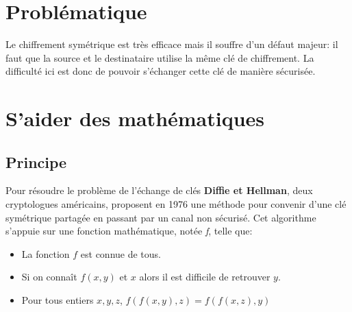 \documentclass[a4paper,11pt]{article}
\begin{document}
\section{Problématique}
Le chiffrement symétrique est très efficace mais il souffre d'un défaut majeur: il faut que la source et le destinataire utilise la même clé de chiffrement. La difficulté ici est donc de pouvoir s'échanger cette clé de manière sécurisée.
\begin{center}
\end{center}
\section{S'aider des mathématiques}
\subsection{Principe}
Pour résoudre le problème de l'échange de clés \textbf{Diffie et Hellman}, deux cryptologues américains, proposent en 1976 une méthode pour convenir d'une clé symétrique partagée en passant par un canal non sécurisé. Cet algorithme s'appuie sur une fonction mathématique, notée \emph{f}, telle que:
\begin{itemize}
    \item La fonction $f$ est connue de tous.
    \item Si on connaît $f(x,y)$ et $x$ alors il est difficile de retrouver $y$.
    \item Pour tous entiers $x,y,z$, $f(f(x,y),z)=f(f(x,z),y)$
\end{itemize}
\end{document}
